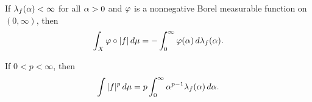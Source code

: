 \vs

\begin{prop}
If $\lambda_f(\alpha) < \infty$ for all $\alpha > 0$ and $\varphi$ is a nonnegative Borel measurable function on $(0,\infty)$, then
\[\int_X\varphi\circ|f|\,d\mu = -\int_0^\infty \varphi(\alpha)\,d\lambda_f(\alpha).\]
\end{prop}

\vs
\begin{prop}
If $0 < p < \infty$, then
\[\int|f|^p\,d\mu = p \int_0^\infty \alpha^{p - 1}\lambda_f(\alpha)\,d\alpha.\]
\end{prop}
